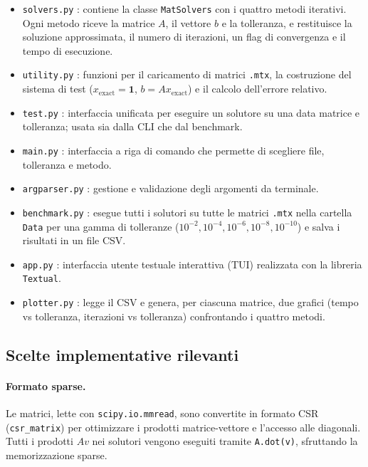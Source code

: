 \documentclass[a4paper,12pt]{article}
\begin{document}
\begin{itemize}
    \item \texttt{solvers.py} : contiene la classe \texttt{MatSolvers} con i quattro metodi iterativi. Ogni metodo riceve la matrice $A$, il vettore $b$ e la tolleranza, e restituisce la soluzione approssimata, il numero di iterazioni, un flag di convergenza e il tempo di esecuzione.
    \item \texttt{utility.py} : funzioni per il caricamento di matrici \texttt{.mtx}, la costruzione del sistema di test ($x_{\text{exact}} = \mathbf{1}$, $b = Ax_{\text{exact}}$) e il calcolo dell'errore relativo.
    \item \texttt{test.py} : interfaccia unificata per eseguire un solutore su una data matrice e tolleranza; usata sia dalla CLI che dal benchmark.
    \item \texttt{main.py} : interfaccia a riga di comando che permette di scegliere file, tolleranza e metodo.
    \item \texttt{argparser.py} : gestione e validazione degli argomenti da terminale.
    \item \texttt{benchmark.py} : esegue tutti i solutori su tutte le matrici \texttt{.mtx} nella cartella \texttt{Data} per una gamma di tolleranze ($10^{-2}, 10^{-4}, 10^{-6}, 10^{-8}, 10^{-10}$) e salva i risultati in un file CSV.
    \item \texttt{app.py} : interfaccia utente testuale interattiva (TUI) realizzata con la libreria \texttt{Textual}.
    \item \texttt{plotter.py} : legge il CSV e genera, per ciascuna matrice, due grafici (tempo vs tolleranza, iterazioni vs tolleranza) confrontando i quattro metodi.
\end{itemize}

\subsection{Scelte implementative rilevanti}

\paragraph{Formato sparse.}
Le matrici, lette con \texttt{scipy.io.mmread}, sono convertite in formato CSR (\texttt{csr\_matrix}) per ottimizzare i prodotti matrice-vettore e l'accesso alle diagonali. Tutti i prodotti $Av$ nei solutori vengono eseguiti tramite \texttt{A.dot(v)}, sfruttando la memorizzazione sparse.
\end{document}
